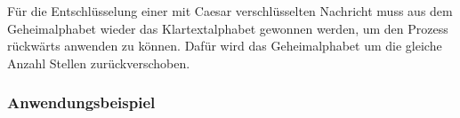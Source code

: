\begin{table}[h!]
\centering
\caption{Die Generation des Geheimalphabets aus dem Klartextalphabet}
\label{tab:generation-caesar}
\end{table}

Für die Entschlüsselung einer mit Caesar verschlüsselten Nachricht muss aus dem Geheimalphabet wieder das Klartextalphabet gewonnen werden, um den Prozess rückwärts anwenden zu können. Dafür wird das Geheimalphabet um die gleiche Anzahl Stellen zurückverschoben.

\subsubsection{Anwendungsbeispiel}
\label{sec:c-anwendungsbeispiel}

